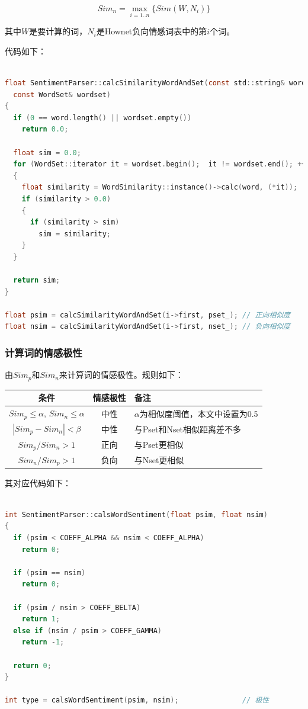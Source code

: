 \documentclass[11pt,a4paper]{article}
\begin{document}
\[
Sim_{n} = \max_{i=1..n}\{Sim(W, N_{i})\}
\]

其中$W$是要计算的词，$N_{i}$是Hownet负向情感词表中的第$i$个词。

代码如下：\vspace{6pt}

{\scriptsize\begin{lstlisting}[language=C]

float SentimentParser::calcSimilarityWordAndSet(const std::string& word, 
  const WordSet& wordset)
{
  if (0 == word.length() || wordset.empty())
    return 0.0;

  float sim = 0.0;
  for (WordSet::iterator it = wordset.begin();  it != wordset.end(); ++ it)
  {
    float similarity = WordSimilarity::instance()->calc(word, (*it));
    if (similarity > 0.0)
    {
      if (similarity > sim)
        sim = similarity;
    }
  }

  return sim;
}

float psim = calcSimilarityWordAndSet(i->first, pset_); // 正向相似度
float nsim = calcSimilarityWordAndSet(i->first, nset_); // 负向相似度
\end{lstlisting}}


\subsubsection{计算词的情感极性}

由$Sim_{p}$和$Sim_{n}$来计算词的情感极性。规则如下：

\begin{center}
\begin{tabular}{|c|c|l|}
\hline
条件 & 情感极性 & 备注 \\
\hline
$Sim_{p}\leq\alpha$, $Sim_{n}\leq\alpha$ & 中性 & $\alpha$为相似度阈值，本文中设置为0.5\\
\hline
$|Sim_{p}-Sim_{n}|<\beta$ & 中性 & 与Pset和Nset相似距离差不多 \\
\hline
$Sim_{p}/Sim_{n} > 1$ & 正向 & 与Pset更相似 \\
\hline
$Sim_{n}/Sim_{p} > 1$ & 负向 & 与Nset更相似 \\
\hline
\end{tabular}
\end{center}

其对应代码如下：\vspace{6pt}

{\scriptsize\begin{lstlisting}[language=C]

int SentimentParser::calsWordSentiment(float psim, float nsim)
{
  if (psim < COEFF_ALPHA && nsim < COEFF_ALPHA)
    return 0;

  if (psim == nsim)
    return 0;

  if (psim / nsim > COEFF_BELTA)
    return 1;
  else if (nsim / psim > COEFF_GAMMA)
    return -1;

  return 0;
}

int type = calsWordSentiment(psim, nsim);               // 极性

\end{lstlisting}}
\end{document}
